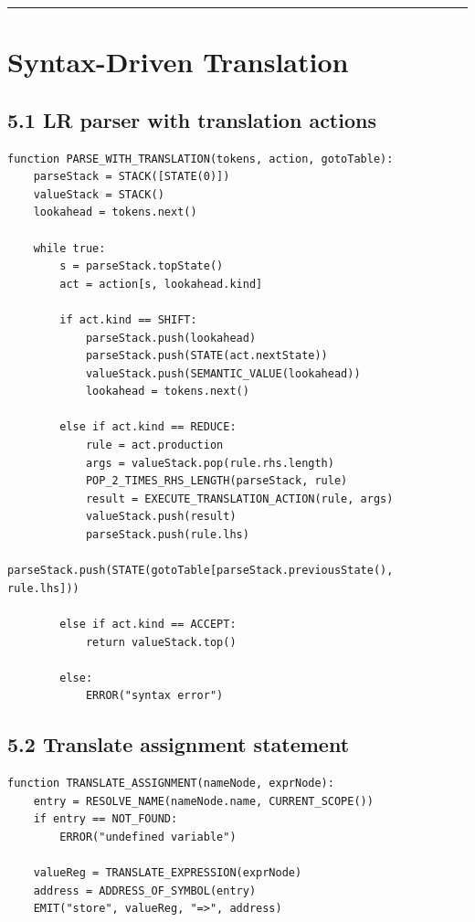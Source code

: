 \documentclass[10pt,letterpaper]{article}
\begin{document}
\medskip\hrule\medskip

\clearpage
\section{Syntax-Driven Translation}

\subsection*{5.1 LR parser with translation actions}
{}

\begin{verbatim}
function PARSE_WITH_TRANSLATION(tokens, action, gotoTable):
    parseStack = STACK([STATE(0)])
    valueStack = STACK()
    lookahead = tokens.next()

    while true:
        s = parseStack.topState()
        act = action[s, lookahead.kind]

        if act.kind == SHIFT:
            parseStack.push(lookahead)
            parseStack.push(STATE(act.nextState))
            valueStack.push(SEMANTIC_VALUE(lookahead))
            lookahead = tokens.next()

        else if act.kind == REDUCE:
            rule = act.production
            args = valueStack.pop(rule.rhs.length)
            POP_2_TIMES_RHS_LENGTH(parseStack, rule)
            result = EXECUTE_TRANSLATION_ACTION(rule, args)
            valueStack.push(result)
            parseStack.push(rule.lhs)
            parseStack.push(STATE(gotoTable[parseStack.previousState(), rule.lhs]))

        else if act.kind == ACCEPT:
            return valueStack.top()

        else:
            ERROR("syntax error")
\end{verbatim}

\subsection*{5.2 Translate assignment statement}
{}

\begin{verbatim}
function TRANSLATE_ASSIGNMENT(nameNode, exprNode):
    entry = RESOLVE_NAME(nameNode.name, CURRENT_SCOPE())
    if entry == NOT_FOUND:
        ERROR("undefined variable")

    valueReg = TRANSLATE_EXPRESSION(exprNode)
    address = ADDRESS_OF_SYMBOL(entry)
    EMIT("store", valueReg, "=>", address)
\end{verbatim}
\end{document}
